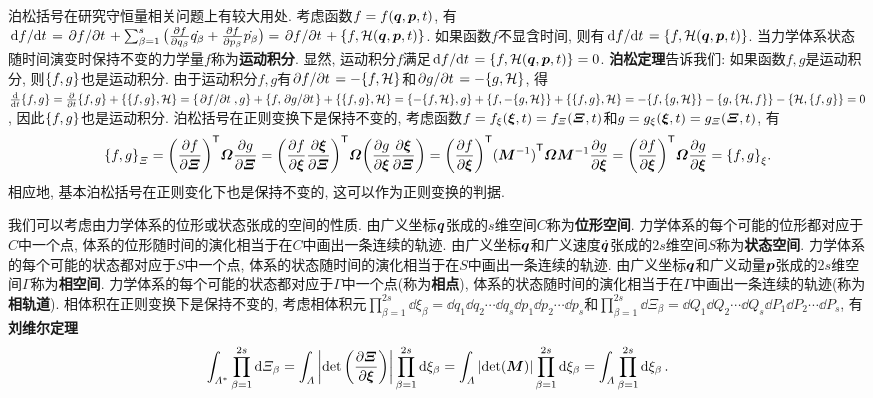 泊松括号在研究守恒量相关问题上有较大用处. 考虑函数$ f=f(\vb*{q},\vb*{p},t) $, 有$ \dv*{f}{t} = \pdv*{f}{t}+\sum_{\beta=1}^s \big(\pdv{f}{q_{\beta}}\dot{q_{\beta}}+\pdv{f}{p_{\beta}}\dot{p_{\beta}}\big) = \pdv*{f}{t}+\pb{f}{\hami(\vb*{q},\vb*{p},t)} $. 如果函数$ f $不显含时间, 则有$ \dv*{f}{t} = \pb{f}{\hami(\vb*{q},\vb*{p},t)} $. 当力学体系状态随时间演变时保持不变的力学量$ f $称为\textbf{运动积分}. 显然, 运动积分$ f $满足$ \dv*{f}{t}=\pb{f}{\hami(\vb*{q},\vb*{p},t)}=0 $. \textbf{泊松定理}告诉我们: 如果函数$ f,g $是运动积分, 则$ \pb{f}{g} $也是运动积分. 由于运动积分$ f,g $有$ \pdv*{f}{t}=-\pb{f}{\hami} $和$ \pdv*{g}{t}=-\pb{g}{\hami} $, 得$ \dv{t} \pb{f}{g} = \pdv{t} \pb{f}{g}+\pb{\pb{f}{g}}{\hami} = \pb{\pdv*{f}{t}}{g}+\pb{f}{\pdv*{g}{t}}+\pb{\pb{f}{g}}{\hami} = \pb{-\pb{f}{\hami}}{g}+\pb{f}{-\pb{g}{\hami}}+\pb{\pb{f}{g}}{\hami} = -\pb{f}{\pb{g}{\hami}}-\pb{g}{\pb{\hami}{f}}-\pb{\hami}{\pb{f}{g}} = 0 $, 因此$ \pb{f}{g} $也是运动积分. 泊松括号在正则变换下是保持不变的, 考虑函数$ f=f_{\xi}(\vb*{\xi},t)=f_{\varXi}(\vb*{\varXi},t) $和$ g=g_{\xi}(\vb*{\xi},t)=g_{\varXi}(\vb*{\varXi},t) $, 有
\begin{equation*}
    \pb{f}{g}_{\varXi} = \transpose{\bigg(\pdv{f}{\vb*{\varXi}}\bigg)} \vb*{\varOmega} \pdv{g}{\vb*{\varXi}} = \transpose{\bigg(\pdv{f}{\vb*{\xi}}\pdv{\vb*{\xi}}{\vb*{\varXi}}\bigg)} \vb*{\varOmega} \bigg(\pdv{g}{\vb*{\xi}}\pdv{\vb*{\xi}}{\vb*{\varXi}}\bigg) = \transpose{\bigg(\pdv{f}{\vb*{\xi}}\bigg)} \transpose{(\vb*{M}^{-1})} \vb*{\varOmega}\vb*{M}^{-1} \pdv{g}{\vb*{\xi}} = \transpose{\bigg(\pdv{f}{\vb*{\xi}}\bigg)} \vb*{\varOmega} \pdv{g}{\vb*{\xi}} = \pb{f}{g}_{\xi}.
\end{equation*}
相应地, 基本泊松括号在正则变化下也是保持不变的, 这可以作为正则变换的判据.

我们可以考虑由力学体系的位形或状态张成的空间的性质. 由广义坐标$ \vb*{q} $张成的$ s $维空间$ C $称为\textbf{位形空间}. 力学体系的每个可能的位形都对应于$ C $中一个点, 体系的位形随时间的演化相当于在$ C $中画出一条连续的轨迹. 由广义坐标$ \vb*{q} $和广义速度$ \dot{\vb*{q}} $张成的$ 2s $维空间$ S $称为\textbf{状态空间}. 力学体系的每个可能的状态都对应于$ S $中一个点, 体系的状态随时间的演化相当于在$ S $中画出一条连续的轨迹. 由广义坐标$ \vb*{q} $和广义动量$ \vb*{p} $张成的$ 2s $维空间$ \varGamma $称为\textbf{相空间}. 力学体系的每个可能的状态都对应于$ \varGamma $中一个点(称为\textbf{相点}), 体系的状态随时间的演化相当于在$ \varGamma $中画出一条连续的轨迹(称为\textbf{相轨道}). 相体积在正则变换下是保持不变的, 考虑相体积元$ \prod_{\beta=1}^{2s} \dd{\xi_{\beta}}=\dd{q_1}\dd{q_2}\cdots\dd{q_s}\dd{p_1}\dd{p_2}\cdots\dd{p_s} $和$ \prod_{\beta=1}^{2s} \dd{\varXi_{\beta}}=\dd{Q_1}\dd{Q_2}\cdots\dd{Q_s}\dd{P_1}\dd{P_2}\cdots\dd{P_s} $, 有\textbf{刘维尔定理}
\begin{equation*}
    \int_{\varLambda^*} \prod_{\beta=1}^{2s} \dd{\varXi_{\beta}} = \int_{\varLambda} \abs{\det\bigg(\pdv{\vb*{\varXi}}{\vb*{\xi}}\bigg)} \prod_{\beta=1}^{2s} \dd{\xi_{\beta}} = \int_{\varLambda} \abs{\det(\vb*{M})} \prod_{\beta=1}^{2s} \dd{\xi_{\beta}} = \int_{\varLambda} \prod_{\beta=1}^{2s} \dd{\xi_{\beta}}.
\end{equation*}



